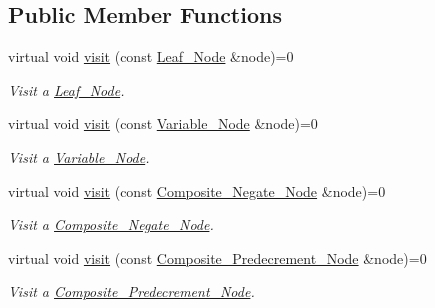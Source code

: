 \subsection*{Public Member Functions}
\begin{DoxyCompactItemize}
\item 
virtual void \hyperlink{classMadara_1_1Expression__Tree_1_1Visitor_ab97d52a179d6874cdab71ab18d00dff6}{visit} (const \hyperlink{classMadara_1_1Expression__Tree_1_1Leaf__Node}{Leaf\_\-Node} \&node)=0
\begin{DoxyCompactList}\small\item\em Visit a \hyperlink{classMadara_1_1Expression__Tree_1_1Leaf__Node}{Leaf\_\-Node}. \item\end{DoxyCompactList}\item 
virtual void \hyperlink{classMadara_1_1Expression__Tree_1_1Visitor_a5dea5d0d83eb683ab0341a4d45fd271a}{visit} (const \hyperlink{classMadara_1_1Expression__Tree_1_1Variable__Node}{Variable\_\-Node} \&node)=0
\begin{DoxyCompactList}\small\item\em Visit a \hyperlink{classMadara_1_1Expression__Tree_1_1Variable__Node}{Variable\_\-Node}. \item\end{DoxyCompactList}\item 
virtual void \hyperlink{classMadara_1_1Expression__Tree_1_1Visitor_afbf6baaf3a8d55a822350ac3292fa605}{visit} (const \hyperlink{classMadara_1_1Expression__Tree_1_1Composite__Negate__Node}{Composite\_\-Negate\_\-Node} \&node)=0
\begin{DoxyCompactList}\small\item\em Visit a \hyperlink{classMadara_1_1Expression__Tree_1_1Composite__Negate__Node}{Composite\_\-Negate\_\-Node}. \item\end{DoxyCompactList}\item 
virtual void \hyperlink{classMadara_1_1Expression__Tree_1_1Visitor_afd6a5648a7d2fef8bd3b5012bc458c04}{visit} (const \hyperlink{classMadara_1_1Expression__Tree_1_1Composite__Predecrement__Node}{Composite\_\-Predecrement\_\-Node} \&node)=0
\begin{DoxyCompactList}\small\item\em Visit a \hyperlink{classMadara_1_1Expression__Tree_1_1Composite__Predecrement__Node}{Composite\_\-Predecrement\_\-Node}. \item\end{DoxyCompactList}\item 

\end{DoxyCompactItemize}
